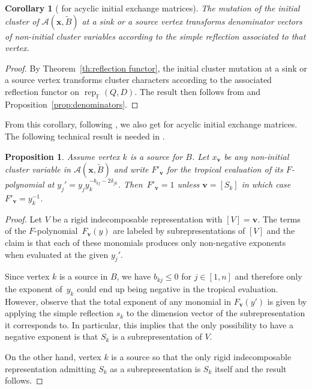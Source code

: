 \documentclass[12pt]{amsart}
\newtheorem{corollary}[theorem]{Corollary}
\newtheorem{proposition}[theorem]{Proposition}
\newcommand{\bfv}{\mathbf{v}}
\newcommand{\bfx}{\mathbf{x}}
\newcommand{\cA}{\mathcal{A}}
\newcommand{\FF}{\mathbb{F}}
\newcommand{\rep}{\operatorname{rep}}
\begin{document}
  \begin{corollary}[{\cite[Conjecture 2.8]{reading-stella}} for acyclic initial exchange matrices]
    The mutation of the initial cluster of $\cA(\bfx,\widetilde{B})$ at a sink or a source vertex transforms denominator vectors of non-initial cluster variables according to the simple reflection associated to that vertex.
  \end{corollary}
  \begin{proof}
    By Theorem~\ref{th:reflection functor}, the initial cluster mutation at a sink or a source vertex transforms cluster characters according to the associated reflection functor on $\rep_{\FF}(Q,D)$.
    The result then follows from \cite[Proposition 2.1]{dlab-ringel} and Proposition~\ref{prop:denominators}.
  \end{proof}

  From this corollary, following \cite[Proposition 2.10]{reading-stella}, we also get \cite[Conjecture 2.7]{reading-stella} for acyclic initial exchange matrices.
  The following technical result is needed in \cite{rupel-stella-williams}.

  \begin{proposition}
    \label{prop:principal F-polynomials}
    Assume vertex $k$ is a source for $B$.
    Let $x_\bfv$ be any non-initial cluster variable in $\cA(\bfx,\widetilde{B})$ and write $F'_\bfv$ for the tropical evaluation of its $F$-polynomial at $y_j'=y_jy_k^{-b_{kj}-2\delta_{jk}}$.
    Then~$F'_\bfv=1$ unless $\bfv=[S_k]$ in which case $F'_\bfv=y_k^{-1}$.
  \end{proposition}
  \begin{proof}
    Let $V$ be a rigid indecomposable representation with $[V]=\bfv$.
    The terms of the $F$-polynomial~$F_\bfv(y)$ are labeled by subrepresentations of $[V]$ and the claim is that each of these monomials produces only non-negative exponents when evaluated at the given $y_j'$.

    Since vertex $k$ is a source in $B$, we have $b_{kj}\leq 0$ for $j\in[1,n]$ and therefore only the exponent of~$y_k$ could end up being negative in the tropical evaluation.
    However, observe that the total exponent of any monomial in $F_\bfv(y')$ is given by applying the simple reflection $s_k$ to the dimension vector of the subrepresentation it corresponds to.
    In particular, this implies that the only possibility to have a negative exponent is that $S_k$ is a subrepresentation of $V$.

    On the other hand, vertex $k$ is a source so that the only rigid indecomposable representation admitting $S_k$ as a subrepresentation is $S_k$ itself and the result follows.
  \end{proof}
\end{document}
